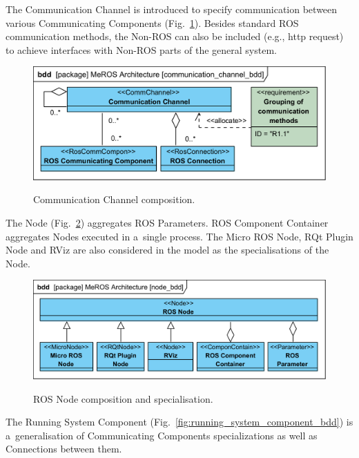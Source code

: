 \documentclass[11pt,oneside,a4paper]{report}
\begin{document}
	The Communication Channel is introduced to specify communication between various Communicating Components (Fig.~\ref{fig:communication_channel_bdd}).
	Besides standard ROS communication methods, the Non-ROS can also be included (e.g., http request) to achieve interfaces with Non-ROS parts of the general system. 
	

	\begin{figure}[H]
		\centering
		\begin{center}
			{\includegraphics[scale=.97]{diagrams/communication_channel_bdd.png}}
		\end{center}
		\caption{Communication Channel composition.} 
		\label{fig:communication_channel_bdd}
	\end{figure}
	
		 
 	The Node (Fig.~\ref{fig:node_bdd}) aggregates ROS Parameters. ROS Component Container aggregates Nodes executed in a~single process. The Micro ROS Node, RQt Plugin Node and RViz are also considered in the model as the specialisations of the Node.
 	
	 
 	\begin{figure}[H]
	 	\centering
	 	\begin{center}
	 		{\includegraphics[scale=.97]{diagrams/node_bdd.png}}
	 	\end{center}
	 	\caption{ROS Node composition and specialisation.} 
		 	\label{fig:node_bdd}
	 \end{figure}
	
	\pagebreak
	 
	The Running System Component (Fig.~\ref{fig:running_system_component_bdd}) is a~generalisation of Communicating Components specializations as well as Connections between them. 
	
\end{document}
